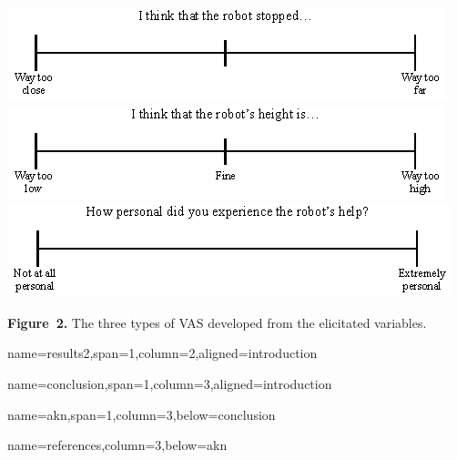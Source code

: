 \documentclass[paperwidth=160cm,paperheight=100cm,landscape,fontscale=0.3010]{baposter}
\begin{document}
\begin{poster}
{\begin{center}
	\includegraphics[width=0.7\linewidth]{RStopped.eps}
	\includegraphics[width=0.7\linewidth]{RobotHeight.eps}
	\includegraphics[width=0.7\linewidth]{PersonalHelp.eps}

	\textbf{Figure~2. }The three types of VAS developed from the elicitated variables.
\end{center}
\vspace{-10pt}
}



{name=results2,span=1,column=2,aligned=introduction}
{\parskip 5pt


}


{name=conclusion,span=1,column=3,aligned=introduction}
{\parskip 5pt

}


{name=akn,span=1,column=3,below=conclusion}
{\parskip 5pt

}


{name=references,column=3,below=akn}
{
\renewcommand{\section}[2]{}%
\footnotesize
}



\end{poster}
\end{document}
